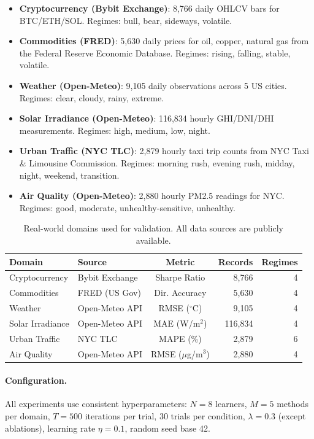\documentclass{article}
\begin{document}
\begin{itemize}
    \item \textbf{Cryptocurrency (Bybit Exchange)}: 8,766 daily OHLCV bars for BTC/ETH/SOL. Regimes: bull, bear, sideways, volatile.
    \item \textbf{Commodities (FRED)}: 5,630 daily prices for oil, copper, natural gas from the Federal Reserve Economic Database. Regimes: rising, falling, stable, volatile.
    \item \textbf{Weather (Open-Meteo)}: 9,105 daily observations across 5 US cities. Regimes: clear, cloudy, rainy, extreme.
    \item \textbf{Solar Irradiance (Open-Meteo)}: 116,834 hourly GHI/DNI/DHI measurements. Regimes: high, medium, low, night.
    \item \textbf{Urban Traffic (NYC TLC)}: 2,879 hourly taxi trip counts from NYC Taxi \& Limousine Commission. Regimes: morning rush, evening rush, midday, night, weekend, transition.
    \item \textbf{Air Quality (Open-Meteo)}: 2,880 hourly PM2.5 readings for NYC. Regimes: good, moderate, unhealthy-sensitive, unhealthy.
\end{itemize}

\begin{table}[t]
\centering
\small
\caption{Real-world domains used for validation. All data sources are publicly available.}
\label{tab:domains}
\begin{tabular}{llcrr}
\toprule
\textbf{Domain} & \textbf{Source} & \textbf{Metric} & \textbf{Records} & \textbf{Regimes} \\
\midrule
Cryptocurrency & Bybit Exchange & Sharpe Ratio & 8,766 & 4 \\
Commodities & FRED (US Gov) & Dir. Accuracy & 5,630 & 4 \\
Weather & Open-Meteo API & RMSE ($^\circ$C) & 9,105 & 4 \\
Solar Irradiance & Open-Meteo API & MAE (W/m$^2$) & 116,834 & 4 \\
Urban Traffic & NYC TLC & MAPE (\%) & 2,879 & 6 \\
Air Quality & Open-Meteo API & RMSE ($\mu$g/m$^3$) & 2,880 & 4 \\
\bottomrule
\end{tabular}
\end{table}

\paragraph{Configuration.} All experiments use consistent hyperparameters: $N = 8$ learners, $M = 5$ methods per domain, $T = 500$ iterations per trial, 30 trials per condition, $\lambda = 0.3$ (except ablations), learning rate $\eta = 0.1$, random seed base 42.
\end{document}
